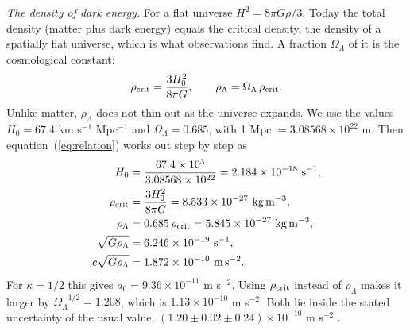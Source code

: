 \documentclass[fleqn,usenatbib]{mnras}
\begin{document}
\emph{The density of dark energy.} For a flat universe $H^2=8\pi G\rho/3$. Today the total density (matter plus dark energy) equals the critical density, the density of a spatially flat universe, which is what observations find. A fraction $\Omega_\Lambda$ of it is the cosmological constant:
\begin{equation}
\rho_{\rm crit}=\frac{3H_0^2}{8\pi G},\qquad \rho_\Lambda=\Omega_\Lambda\,\rho_{\rm crit}.
\label{eq:rho}
\end{equation}
Unlike matter, $\rho_\Lambda$ does not thin out as the universe expands. We use the \citet{Planck2020} values $H_0=67.4$ km s$^{-1}$ Mpc$^{-1}$ and $\Omega_\Lambda=0.685$, with 1 Mpc $=3.08568\times10^{22}$ m. Then equation~(\ref{eq:relation}) works out step by step as
\begin{equation}
\begin{aligned}
H_0&=\frac{67.4\times10^{3}}{3.08568\times10^{22}}=2.184\times10^{-18}\ {\rm s^{-1}},\\
\rho_{\rm crit}&=\frac{3H_0^2}{8\pi G}=8.533\times10^{-27}\ {\rm kg\,m^{-3}},\\
\rho_\Lambda&=0.685\,\rho_{\rm crit}=5.845\times10^{-27}\ {\rm kg\,m^{-3}},\\
\sqrt{G\rho_\Lambda}&=6.246\times10^{-19}\ {\rm s^{-1}},\\
c\sqrt{G\rho_\Lambda}&=1.872\times10^{-10}\ {\rm m\,s^{-2}} .
\end{aligned}
\end{equation}
For $\kappa=1/2$ this gives $a_0=9.36\times10^{-11}$ m s$^{-2}$. Using $\rho_{\rm crit}$ instead of $\rho_\Lambda$ makes it larger by $\Omega_\Lambda^{-1/2}=1.208$, which is $1.13\times10^{-10}$ m s$^{-2}$. Both lie inside the stated uncertainty of the usual value, $(1.20\pm0.02\pm0.24)\times10^{-10}$ m s$^{-2}$ \citep{McGaugh2016}.
\end{document}
